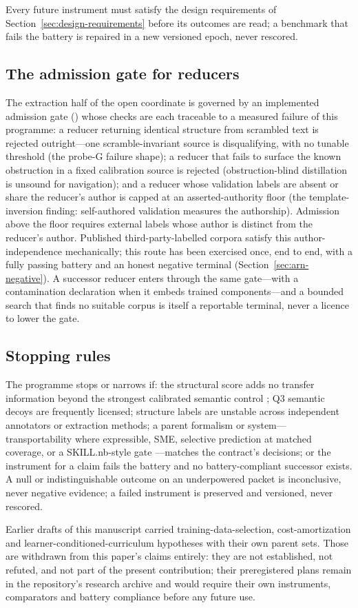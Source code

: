 Every future instrument must satisfy the design requirements of Section~\ref{sec:design-requirements} before its outcomes are read; a benchmark that fails the battery is repaired in a new versioned epoch, never rescored.

\subsection{The admission gate for reducers}

The extraction half of the open coordinate is governed by an implemented admission gate () whose checks are each traceable to a measured failure of this programme: a reducer returning identical structure from scrambled text is rejected outright---one scramble-invariant source is disqualifying, with no tunable threshold (the probe-G failure shape); a reducer that fails to surface the known obstruction in a fixed calibration source is rejected (obstruction-blind distillation is unsound for navigation); and a reducer whose validation labels are absent or share the reducer's author is capped at an asserted-authority floor (the template-inversion finding: self-authored validation measures the authorship). Admission above the floor requires external labels whose author is distinct from the reducer's author. Published third-party-labelled corpora satisfy this author-independence mechanically; this route has been exercised once, end to end, with a fully passing battery and an honest negative terminal (Section~\ref{sec:arn-negative}). A successor reducer enters through the same gate---with a contamination declaration when it embeds trained components---and a bounded search that finds no suitable corpus is itself a reportable terminal, never a licence to lower the gate.

\subsection{Stopping rules}

The programme stops or narrows if: the structural score adds no transfer information beyond the strongest calibrated semantic control \cite{xiao2026skillsight}; Q3 semantic decoys are frequently licensed; structure labels are unstable across independent annotators or extraction methods; a parent formalism or system---transportability where expressible, SME, selective prediction at matched coverage, or a SKILL.nb-style gate \cite{elhattami2026skillnb}---matches the contract's decisions; or the instrument for a claim fails the battery and no battery-compliant successor exists. A null or indistinguishable outcome on an underpowered packet is inconclusive, never negative evidence; a failed instrument is preserved and versioned, never rescored.

Earlier drafts of this manuscript carried training-data-selection, cost-amortization and learner-conditioned-curriculum hypotheses with their own parent sets. Those are withdrawn from this paper's claims entirely: they are not established, not refuted, and not part of the present contribution; their preregistered plans remain in the repository's research archive and would require their own instruments, comparators and battery compliance before any future use.

